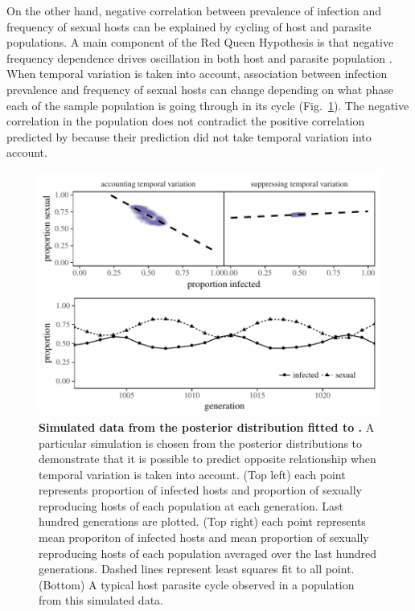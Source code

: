 \documentclass{article}\usepackage[]{graphicx}\usepackage[]{color}
\newcommand{\fref}[1]{Fig.~\ref{fig:#1}}
\begin{document}
On the other hand, negative correlation between prevalence of infection and frequency of sexual hosts can be explained by cycling of host and parasite populations.
A main component of the Red Queen Hypothesis is that negative frequency dependence drives oscillation in both host and parasite population \citep{hamilton1980sex}.
When temporal variation is taken into account, association between infection prevalence and frequency of sexual hosts can change depending on what phase each of the sample population is going through in its cycle (\fref{cycle}).
The negative correlation in the population does not contradict the positive correlation predicted by \cite{lively2001trematode} because their prediction did not take temporal variation into account.

\begin{figure}[!ht]
\includegraphics[width=\textwidth]{../fig/cycle_example.pdf}
\caption{{\bf Simulated data from the posterior distribution fitted to \cite{vergara2014infection}.}
A particular simulation is chosen from the posterior distributions to demonstrate that it is possible to predict opposite relationship when temporal variation is taken into account. (Top left) each point represents proportion of infected hosts and proportion of sexually reproducing hosts of each population at each generation. Last hundred generations are plotted. (Top right) each point represents mean proporiton of infected hosts and mean proportion of sexually reproducing hosts of each population averaged over the last hundred generations. Dashed lines represent least squares fit to all point. (Bottom) A typical host parasite cycle observed in a population from this simulated data. %
}
\label{fig:cycle}
\end{figure}



\end{document}
